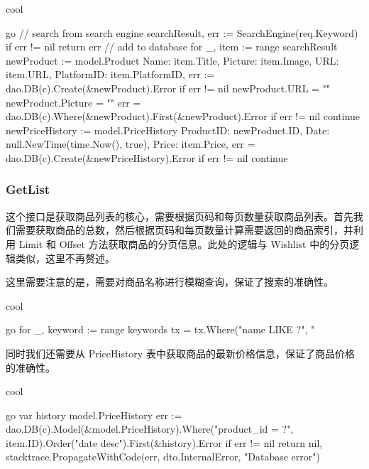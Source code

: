 \begin{codebox}{}{cool}
\begin{amzcode}{go}
// search from search engine
searchResult, err := SearchEngine(req.Keyword)
if err != nil {
    return err
}
// add to database
for _, item := range searchResult {
    newProduct := model.Product{
        Name:       item.Title,
        Picture:    item.Image,
        URL:        item.URL,
        PlatformID: item.PlatformID,
    }
    err := dao.DB(c).Create(&newProduct).Error
    if err != nil {
        newProduct.URL = ""
        newProduct.Picture = ""
        err = dao.DB(c).Where(&newProduct).First(&newProduct).Error
        if err != nil {
            continue
        }
    }
    newPriceHistory := model.PriceHistory{
        ProductID: newProduct.ID,
        Date:      null.NewTime(time.Now(), true),
        Price:     item.Price,
    }
    err = dao.DB(c).Create(&newPriceHistory).Error
    if err != nil {
        continue
    }
}
\end{amzcode}
\end{codebox}

\subsubsection{GetList}

这个接口是获取商品列表的核心，需要根据页码和每页数量获取商品列表。首先我们需要获取商品的总数，然后根据页码和每页数量计算需要返回的商品索引，并利用 Limit 和 Offset 方法获取商品的分页信息。此处的逻辑与 Wishlist 中的分页逻辑类似，这里不再赘述。

这里需要注意的是，需要对商品名称进行模糊查询，保证了搜索的准确性。

\begin{codebox}{}{cool}
\begin{amzcode}{go}
for _, keyword := range keywords {
    tx = tx.Where("name LIKE ?", "%
}
\end{amzcode}
\end{codebox}

同时我们还需要从 PriceHistory 表中获取商品的最新价格信息，保证了商品价格的准确性。

\begin{codebox}{}{cool}
\begin{amzcode}{go}
var history model.PriceHistory
err := dao.DB(c).Model(&model.PriceHistory{}).Where("product_id = ?", item.ID).Order("date desc").First(&history).Error
if err != nil {
    return nil, stacktrace.PropagateWithCode(err, dto.InternalError, "Database error")
}
\end{amzcode}
\end{codebox}

